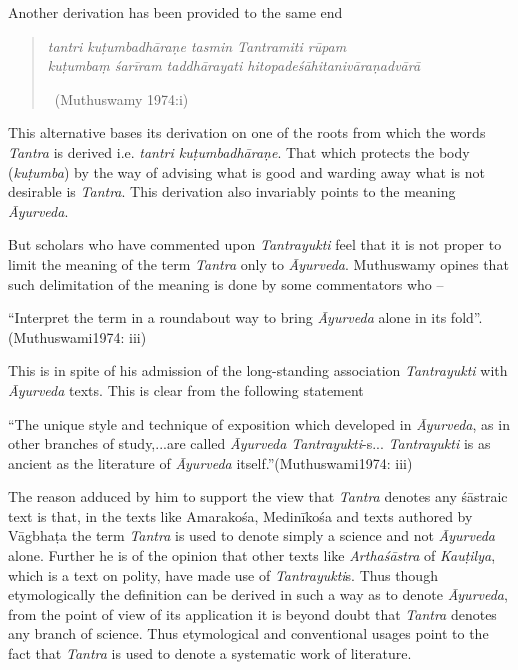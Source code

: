 Another derivation has been provided to the same end

\begin{verse}
\textit{tantri kuṭumbadhāraṇe tasmin Tantramiti rūpam}\\\textit{kuṭumbaṃ śarīram taddhārayati hitopadeśāhitanivāraṇadvārā}

~\hfill (Muthuswamy 1974:i)
\end{verse}

This alternative bases its derivation on one of the roots from which the words \textit{Tantra} is derived i.e. \textit{tantri kuṭumbadhāraṇe}. That which protects the body (\textit{kuṭumba}) by the way of advising what is good and warding away what is not desirable is \textit{Tantra}. This derivation also invariably points to the meaning \textit{Āyurveda}.

But scholars who have commented upon \textit{Tantrayukti} feel that it is not proper to limit the meaning of the term \textit{Tantra} only to \textit{Āyurveda}. Muthuswamy opines that such delimitation of the meaning is done by some commentators who –

\begin{myquote}
“Interpret the term in a roundabout way to bring \textit{Āyurveda} alone in its fold”.\hfill (Muthuswami1974: iii)
\end{myquote}

This is in spite of his admission of the long-standing association \textit{Tantrayukti} with \textit{Āyurveda} texts. This is clear from the following statement 

“The unique style and technique of exposition which developed in \textit{Āyurveda}, as in other branches of study,...are called \textit{Āyurveda Tantrayukti}-s... \textit{Tantrayukti} is as ancient as the literature of \textit{Āyurveda} itself.”\hfill (Muthuswami1974: iii)

The reason adduced by him to support the view that \textit{Tantra} denotes any śāstraic text is that, in the texts like Amarakośa, Medinīkośa and texts authored by Vāgbhaṭa the term \textit{Tantra} is used to denote simply a science and not \textit{Āyurveda} alone. Further he is of the opinion that other texts like \textit{Arthaśāstra} of \textit{Kauṭilya}, which is a text on polity, have made use of \textit{Tantrayukti}s. Thus though etymologically the definition can be derived in such a way as to denote \textit{Āyurveda}, from the point of view of its application it is beyond doubt that \textit{Tantra} denotes any branch of science. Thus etymological and conventional usages point to the fact that \textit{Tantra} is used to denote a systematic work of literature.


